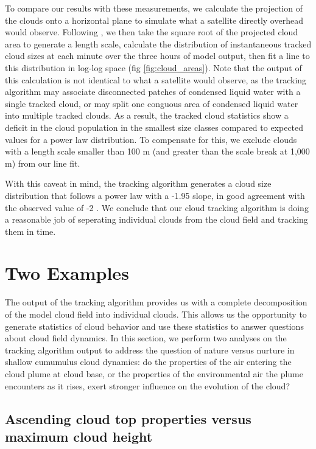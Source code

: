 \documentclass[acp]{copernicus}
\begin{document}
To compare our results with these measurements, we calculate the projection of 
the clouds onto a horizontal plane to simulate what a satellite directly 
overhead would observe.  Following \cite{Zhao2007}, we then take the square 
root of the projected cloud area to generate a length scale, calculate the 
distribution of instantaneous tracked cloud sizes at each minute over the three 
hours of model output, then fit a line to this distribution in log-log space 
(fig \ref{fig:cloud_areas}).  Note that the output of this calculation is not 
identical to what a satellite would observe, as the tracking algorithm may 
associate disconnected patches of condensed liquid water with a single tracked 
cloud, or may split one conguous area of condensed liquid water into multiple 
tracked clouds.  As a result, the tracked cloud statistics show a deficit in 
the cloud population in the smallest size classes compared to expected values 
for a power law distribution.  To compensate for this, we exclude clouds with a 
length scale smaller than 100 m (and greater than the scale break at 1,000 m) 
from our line fit.

With this caveat in mind, the tracking algorithm generates a cloud size 
distribution that follows a power law with a -1.95 slope, in good agreement 
with the observed value of -2 \citep{Zhao2007}.  We conclude that our cloud 
tracking algorithm is doing a reasonable job of seperating individual clouds 
from the cloud field and tracking them in time.


\section{Two Examples}

The output of the tracking algorithm provides us with a complete decomposition 
of the model cloud field into individual clouds.  This allows us the 
opportunity to generate statistics of cloud behavior and use these statistics 
to answer questions about cloud field dynamics.  In this section, we perform 
two analyses on the tracking algorithm output to address the question of nature 
versus nurture in shallow cumumulus cloud dynamics: do the properties of the 
air entering the cloud plume at cloud base, or the properties of the 
environmental air the plume encounters as it rises, exert stronger influence on 
the evolution of the cloud?

\subsection{Ascending cloud top properties versus maximum cloud height}
\end{document}
